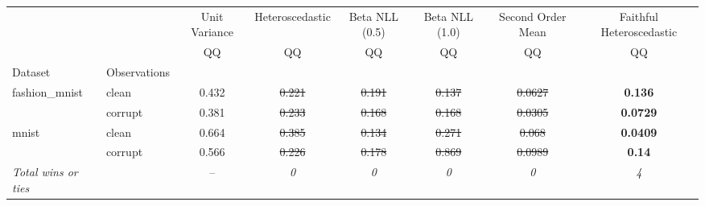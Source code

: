 \begin{tabular}{ll|c|c|c|c|c|c}
\toprule
{} & {} & {Unit Variance} & {Heteroscedastic} & {Beta NLL (0.5)} & {Beta NLL (1.0)} & {Second Order Mean} & {Faithful Heteroscedastic} \\
{} & {} & {QQ} & {QQ} & {QQ} & {QQ} & {QQ} & {QQ} \\
{Dataset} & {Observations} & {} & {} & {} & {} & {} & {} \\
\midrule
\multirow[t]{2}{*}{fashion_mnist} & clean & 0.432 & \sout{0.221} & \sout{0.191} & \sout{0.137} & \sout{0.0627} & \textbf{0.136} \\
 & corrupt & 0.381 & \sout{0.233} & \sout{0.168} & \sout{0.168} & \sout{0.0305} & \textbf{0.0729} \\
\multirow[t]{2}{*}{mnist} & clean & 0.664 & \sout{0.385} & \sout{0.134} & \sout{0.271} & \sout{0.068} & \textbf{0.0409} \\
 & corrupt & 0.566 & \sout{0.226} & \sout{0.178} & \sout{0.869} & \sout{0.0989} & \textbf{0.14} \\
\textit{{Total wins or ties}} &  & -- & \textit{0} & \textit{0} & \textit{0} & \textit{0} & \textit{4} \\
\bottomrule
\end{tabular}
